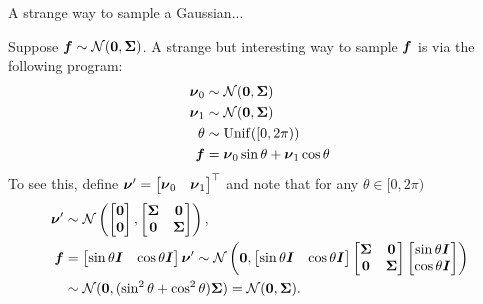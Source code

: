 \documentclass[aspectratio=169]{beamer}
\begin{document}
\begin{frame}{A strange way to sample a Gaussian...}

Suppose $\boldsymbol{f} \sim \mathcal{N}(\boldsymbol{0}, \boldsymbol{\Sigma})$. A strange but interesting way to sample $\boldsymbol{f}$ is via the following program:
\begin{align}
    \boldsymbol{\nu}_0 &\sim \mathcal{N}(\boldsymbol{0}, \boldsymbol{\Sigma}) \\
    \boldsymbol{\nu}_1 &\sim \mathcal{N}(\boldsymbol{0}, \boldsymbol{\Sigma}) \\
    \theta &\sim \mathrm{Unif}([0, 2\pi)) \\
    \boldsymbol{f} &= \boldsymbol{\nu}_0 \sin \theta + \boldsymbol{\nu}_1 \cos \theta
\end{align}
To see this, define $\boldsymbol{\nu}' = \begin{bmatrix} \boldsymbol{\nu}_0 & \boldsymbol{\nu}_1  \end{bmatrix}^\top$ and note that for any $\theta \in [0, 2 \pi)$
\begin{align}
    \boldsymbol{\nu}' 
    &\sim 
    \mathcal{N} \left(
    \begin{bmatrix}
        \boldsymbol{0} \\ 
        \boldsymbol{0} 
    \end{bmatrix},
    \begin{bmatrix}
        \boldsymbol{\Sigma} & \boldsymbol{0} \\ 
        \boldsymbol{0} & \boldsymbol{\Sigma}
    \end{bmatrix}
    \right), \\
    \boldsymbol{f} &= 
    \begin{bmatrix} \sin \theta \boldsymbol{I} & \cos \theta \boldsymbol{I} \end{bmatrix} \boldsymbol{\nu}' 
    \sim \mathcal{N} \left(
    \boldsymbol{0}, 
    \begin{bmatrix} \sin \theta \boldsymbol{I} & \cos \theta \boldsymbol{I} \end{bmatrix}
    \begin{bmatrix}
        \boldsymbol{\Sigma} & \boldsymbol{0} \\ 
        \boldsymbol{0} & \boldsymbol{\Sigma}
    \end{bmatrix}
    \begin{bmatrix} \sin \theta \boldsymbol{I} \\ \cos \theta \boldsymbol{I} \end{bmatrix}
    \right) \\
    &\sim \mathcal{N}(\boldsymbol{0}, (\sin^2 \theta + \cos^2 \theta) \boldsymbol{\Sigma}) = \mathcal{N}(\boldsymbol{0}, \boldsymbol{\Sigma}).
\end{align}
    
\end{frame}
\end{document}
